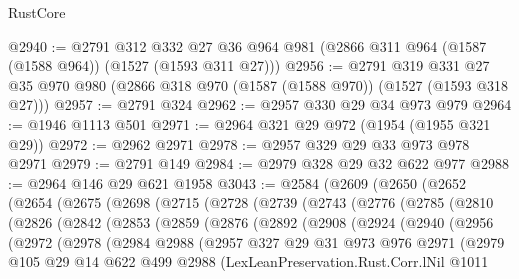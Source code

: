 \begin{lexlean}{RustCore}
\begin{coremodule}
@2940 := @2791
    @312
    @332
    @27
    @36
    @964
    @981
    (@2866 @311 @964 (@1587 (@1588 @964)) (@1527 (@1593 @311 @27)))
@2956 := @2791
    @319
    @331
    @27
    @35
    @970
    @980
    (@2866 @318 @970 (@1587 (@1588 @970)) (@1527 (@1593 @318 @27)))
@2957 := @2791 @324
@2962 := @2957 @330 @29 @34 @973 @979
@2964 := @1946 @1113 @501
@2971 := @2964 @321 @29 @972 (@1954 (@1955 @321 @29))
@2972 := @2962 @2971
@2978 := @2957 @329 @29 @33 @973 @978 @2971
@2979 := @2791 @149
@2984 := @2979 @328 @29 @32 @622 @977
@2988 := @2964 @146 @29 @621 @1958
@3043 := @2584
    (@2609
      (@2650
        (@2652
          (@2654
            (@2675
              (@2698
                (@2715
                  (@2728
                    (@2739
                      (@2743
                        (@2776
                          (@2785
                            (@2810
                              (@2826
                                (@2842
                                  (@2853
                                    (@2859
                                      (@2876
                                        (@2892
                                          (@2908
                                            (@2924
                                              (@2940
                                                (@2956
                                                  (@2972
                                                    (@2978
                                                      (@2984
                                                        @2988
                                                        (@2957
                                                          @327
                                                          @29
                                                          @31
                                                          @973
                                                          @976
                                                          @2971
                                                          (@2979
                                                            @105
                                                            @29
                                                            @14
                                                            @622
                                                            @499
                                                            @2988
                                                            (LexLeanPreservation.Rust.Corr.lNil
                                                              @1011

\end{coremodule}
\end{lexlean}
